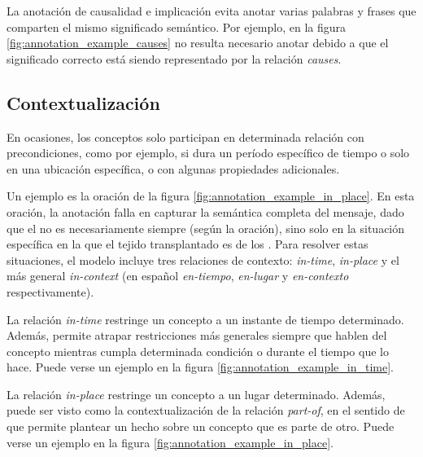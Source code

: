 La anotación de causalidad e implicación evita anotar varias palabras y frases que comparten el mismo significado semántico. Por ejemplo, en la figura \ref{fig:annotation_example_causes} no resulta necesario anotar  debido a que el significado correcto está siendo representado por la relación \textit{causes}.

\subsection{Contextualización}
En ocasiones, los conceptos solo participan en determinada relación con precondiciones, como por ejemplo, si dura un período específico de tiempo o solo en una ubicación específica, o con algunas propiedades adicionales.

Un ejemplo es la oración de la figura \ref{fig:annotation_example_in_place}. En esta oración, la anotación  falla en capturar la semántica completa del mensaje, dado que el  no es necesariamente siempre  (según la oración), sino solo en la situación específica en la que el tejido transplantado es de los . Para resolver estas situaciones, el modelo incluye tres relaciones de contexto: \textit{in-time}, \textit{in-place} y el más general \textit{in-context} (en español \textit{en-tiempo}, \textit{en-lugar} y \textit{en-contexto} respectivamente).

La relación \textit{in-time} restringe un concepto a un instante de tiempo determinado. Además, permite atrapar restricciones más generales siempre que hablen del concepto mientras cumpla determinada condición o durante el tiempo que lo hace. Puede verse un ejemplo en la figura \ref{fig:annotation_example_in_time}.

La relación \textit{in-place} restringe un concepto a un lugar determinado. Además, puede ser visto como la contextualización de la relación \textit{part-of}, en el sentido de que permite plantear un hecho sobre un concepto que es parte de otro. Puede verse un ejemplo en la figura \ref{fig:annotation_example_in_place}.

